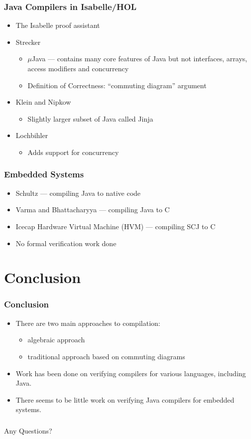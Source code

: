 \documentclass{beamer}
\newcommand{\beginbackup}{
   \newcounter{framenumbervorappendix}
   \setcounter{framenumbervorappendix}{\value{framenumber}}
}
\newcommand{\backupend}{
   \addtocounter{framenumbervorappendix}{-\value{framenumber}}
   \addtocounter{framenumber}{\value{framenumbervorappendix}} 
}
\newcommand{\footmake}[1]{
\ifthenelse{\equal{#1}{}}%
	{}%
	{\footnotetext{#1}}%
}
\newenvironment{slide}[2][fragile,environment=slide]
{\begin{frame}[#1]
	\frametitle{#2}\begin{refsegment}}
{\footmake{\printbibliography[segment=\therefsegment]}\end{refsegment}\end{frame}}
\begin{document}
\begin{slide}{Java Compilers in Isabelle/HOL}
  \begin{itemize}
  \item The Isabelle proof assistant\cite{nipkow2014}
  \item Strecker\cite{strecker2002}
    \begin{itemize}
    \item $\mu$Java --- contains many core features of Java but not interfaces, arrays, access modifiers and concurrency
    \item Definition of Correctness: ``commuting diagram'' argument
    \end{itemize}
  \item Klein and Nipkow\cite{klein2006}
    \begin{itemize}
    \item Slightly larger subset of Java called Jinja
    \end{itemize}
  \item Lochbihler\cite{lochbihler2010}
    \begin{itemize}
    \item Adds support for concurrency
    \end{itemize}
  \end{itemize}
\end{slide}

\begin{slide}{Embedded Systems}
  \begin{itemize}
  \item Schultz\cite{schultz2003} --- compiling Java to native code
  \item Varma and Bhattacharyya\cite{varma2004} --- compiling Java to C
  \item Icecap Hardware Virtual Machine (HVM)\cite{sondergaard2012, korsholm2014} --- compiling SCJ to C
  \item No formal verification work done
  \end{itemize}
\end{slide}

\section{Conclusion}

\begin{frame}
\frametitle{Conclusion}
  \begin{itemize}
  \item There are two main approaches to compilation:
    \begin{itemize}
    \item algebraic approach
    \item traditional approach based on commuting diagrams
    \end{itemize}
  \item Work has been done on verifying compilers for various languages, including Java.
  \item There seems to be little work on verifying Java compilers for embedded systems.
  \end{itemize}
\end{frame}

\begin{frame}[fragile]
\frametitle{}
\begin{center}
{\huge Any Questions?}
\end{center}
\end{frame}

\beginbackup

\backupend
\end{document}
